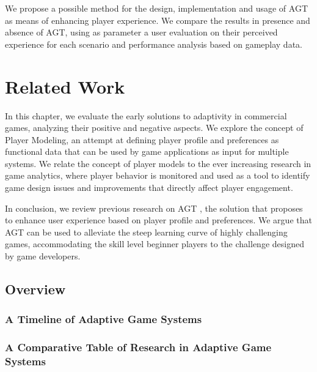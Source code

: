 \documentclass[cic,tc,english]{iiufrgs}
\begin{document}
We propose a possible method for the design, implementation and usage of AGT as means of enhancing player experience. We compare the results in presence and absence of AGT, using as parameter a user evaluation on their perceived experience for each scenario and performance analysis based on gameplay data.


\chapter{Related Work}

In this chapter, we evaluate the early solutions to adaptivity in commercial games, analyzing their positive and negative aspects. We explore the concept of Player Modeling, an attempt at defining player profile and preferences as functional data that can be used by game applications as input for multiple systems. We relate the concept of player models to the ever increasing research in game analytics, where player behavior is monitored and used as a tool to identify game design issues and improvements that directly affect player engagement.

In conclusion, we review previous research on AGT \cite{ARTICLE_PlayerCentredGameDesign}, the solution that proposes to enhance user experience based on player profile and preferences. We argue that AGT can be used to alleviate the steep learning curve of highly challenging games, accommodating the skill level beginner players to the challenge designed by game developers.

\section{Overview}

\subsection{A Timeline of Adaptive Game Systems}

\subsection{A Comparative Table of Research in Adaptive Game Systems}
\end{document}
